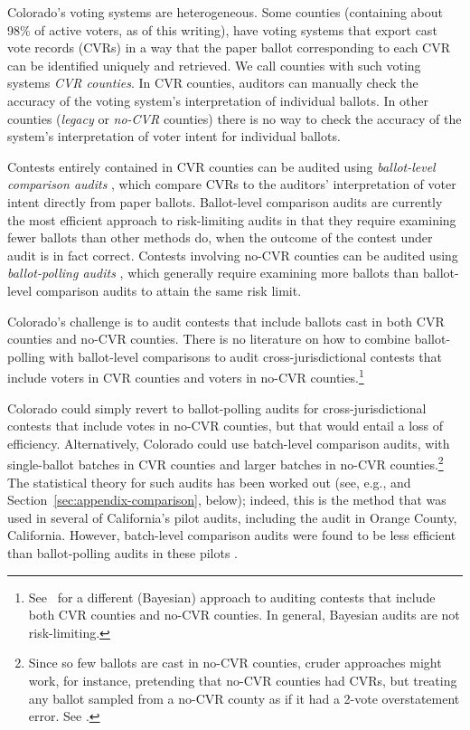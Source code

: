 \documentclass[runningheads]{llncs}
\begin{document}
Colorado's voting systems are heterogeneous. 
Some counties (containing about 98\% of active voters, as of this writing), have 
voting systems that export cast vote records (CVRs) in a way that the paper ballot corresponding to each CVR can be identified uniquely and retrieved.
We call counties with such voting systems \emph{CVR counties}.
In CVR counties, auditors can manually check the accuracy of the voting system's interpretation of individual ballots.
In other counties (\emph{legacy} or \emph{no-CVR} counties) there is no way to check the accuracy
of the system's interpretation of voter intent for individual ballots.

Contests entirely contained in CVR counties can be audited using \emph{ballot-level comparison audits} \cite{lindemanStark12}, which compare CVRs to the auditors' interpretation of voter intent directly from paper ballots.
Ballot-level comparison audits are currently the most efficient approach to risk-limiting audits in that they require examining fewer ballots than other methods do, when the outcome of the contest under audit is in fact correct.
Contests involving no-CVR counties can be audited using \emph{ballot-polling audits} \cite{lindemanEtal12,lindemanStark12},  which generally require examining more ballots than ballot-level comparison audits to attain the same risk limit.

Colorado's challenge is to audit contests that include ballots cast in both CVR counties and no-CVR counties. There is no literature on how to combine ballot-polling with ballot-level comparisons to audit 
cross-jurisdictional contests 
that include voters in CVR counties and voters in no-CVR counties.\footnote{%
  See~\cite{Rivest-2018-bayesian-tabulation-audits}
  for a different (Bayesian) approach to auditing contests that include both CVR counties
  and no-CVR counties. In general, Bayesian audits are not risk-limiting.
}

Colorado could simply revert to ballot-polling audits for cross-jurisdictional contests that include votes in no-CVR counties, but that would entail a loss of efficiency.
Alternatively, Colorado could use batch-level comparison audits, with single-ballot batches in CVR counties and larger batches in no-CVR counties.\footnote{%
Since so few ballots are cast in no-CVR counties, cruder approaches might work, for instance, pretending that no-CVR counties had CVRs, but treating any ballot sampled from a no-CVR county as if it had a 2-vote overstatement error. See \cite{banuelosStark12}.
}
The statistical theory for such audits has been worked out (see, e.g., \cite{stark08a,stark09c,stark09b,stark10d} and Section~\ref{sec:appendix-comparison}, below); indeed, this is the method that was used in several of California's pilot audits, including the audit in Orange County, California.
However, batch-level comparison audits were found to be less efficient than ballot-polling audits in these pilots \cite{CA_SOS_EAC}.
\end{document}
